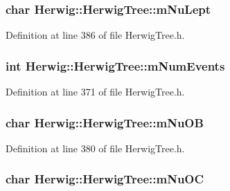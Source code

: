 \subsubsection[{\texorpdfstring{m\+Nu\+Lept}{mNuLept}}]{\setlength{\rightskip}{0pt plus 5cm}char Herwig\+::\+Herwig\+Tree\+::m\+Nu\+Lept\hspace{0.3cm}{\ttfamily [protected]}}\hypertarget{class_herwig_1_1_herwig_tree_a70de329a4eda6e336b1a6154562e2637}{}\label{class_herwig_1_1_herwig_tree_a70de329a4eda6e336b1a6154562e2637}


Definition at line 386 of file Herwig\+Tree.\+h.

\subsubsection[{\texorpdfstring{m\+Num\+Events}{mNumEvents}}]{\setlength{\rightskip}{0pt plus 5cm}int Herwig\+::\+Herwig\+Tree\+::m\+Num\+Events\hspace{0.3cm}{\ttfamily [protected]}}\hypertarget{class_herwig_1_1_herwig_tree_a170499fc649b5aced8f83adc5bf8c914}{}\label{class_herwig_1_1_herwig_tree_a170499fc649b5aced8f83adc5bf8c914}


Definition at line 371 of file Herwig\+Tree.\+h.

\subsubsection[{\texorpdfstring{m\+Nu\+OB}{mNuOB}}]{\setlength{\rightskip}{0pt plus 5cm}char Herwig\+::\+Herwig\+Tree\+::m\+Nu\+OB\hspace{0.3cm}{\ttfamily [protected]}}\hypertarget{class_herwig_1_1_herwig_tree_a25e21e2c469c2a038390355a95423b83}{}\label{class_herwig_1_1_herwig_tree_a25e21e2c469c2a038390355a95423b83}


Definition at line 380 of file Herwig\+Tree.\+h.

\subsubsection[{\texorpdfstring{m\+Nu\+OC}{mNuOC}}]{\setlength{\rightskip}{0pt plus 5cm}char Herwig\+::\+Herwig\+Tree\+::m\+Nu\+OC\hspace{0.3cm}{\ttfamily [protected]}}\hypertarget{class_herwig_1_1_herwig_tree_a65ef841ae6a9c77c5a351349a26d3005}{}\label{class_herwig_1_1_herwig_tree_a65ef841ae6a9c77c5a351349a26d3005}


